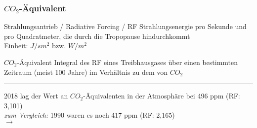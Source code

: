 \begin{frame}
	\frametitle{$CO_2$-Äquivalent}
	
	\begin{block}{Strahlungsantrieb / Radiative Forcing / RF}
		Strahlungsenergie pro Sekunde und pro Quadratmeter, die durch die Tropopause hindurchkommt \\
		Einheit: $J/ sm^2$ bzw. $W/m^2$ 
	\end{block}
	
	\begin{block}{$CO_2$-Äquivalent}
		Integral des RF eines Treibhausgases über einen bestimmten Zeitraum (meist 100 Jahre) im Verhältnis zu dem von $CO_2$
		
	\end{block}


	\color{gray}\rule{\linewidth}{1pt}
	
	\color{black}

	2018 lag der Wert an $CO_2$-Äquivalenten in der Atmosphäre bei 496 ppm (RF: 3,101)\\
	\textit{zum Vergleich: } 1990 waren es noch 417 ppm (RF: 2,165)\\
	$\rightarrow$ \color{red}{Zuwachs des Strahlungsantriebs um 43 \% seit 1990}
\end{frame}

